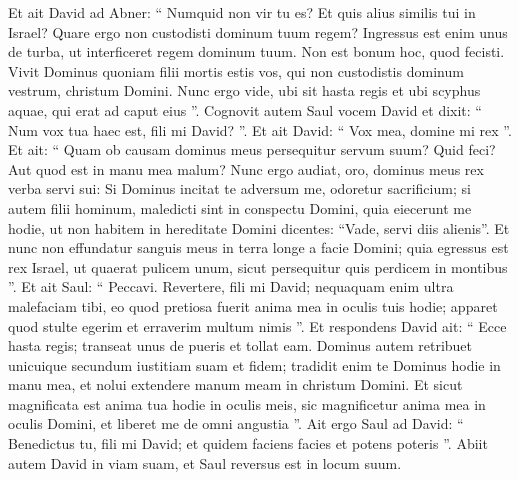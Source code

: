 \begin{biblechapter}
\begin{biblechapter}
\begin{biblechapter}
\begin{biblechapter}
\begin{biblechapter}
\begin{biblechapter}
\begin{biblechapter}
\begin{biblechapter}
\begin{biblechapter}
\begin{biblechapter}
\begin{biblechapter}
\begin{biblechapter}
\begin{biblechapter}
\begin{biblechapter}
\begin{biblechapter}
\begin{biblechapter}
\begin{biblechapter}
\begin{biblechapter}
\begin{biblechapter}
\begin{biblechapter}
\begin{biblechapter}
\begin{biblechapter}
\begin{biblechapter}
\begin{biblechapter}
\begin{biblechapter}
\begin{biblechapter}
\verse Et ait David ad Abner: “ Numquid non vir tu es? Et quis alius similis tui in Israel? Quare ergo non custodisti dominum tuum regem? Ingressus est enim unus de turba, ut interficeret regem dominum tuum. 
\verse Non est bonum hoc, quod fecisti. Vivit Dominus quoniam filii mortis estis vos, qui non custodistis dominum vestrum, christum Domini. Nunc ergo vide, ubi sit hasta regis et ubi scyphus aquae, qui erat ad caput eius ”.
 \verse Cognovit autem Saul vocem David et dixit: “ Num vox tua haec est, fili mi David? ”. Et ait David: “ Vox mea, domine mi rex ”. 
\verse Et ait: “ Quam ob causam dominus meus persequitur servum suum? Quid feci? Aut quod est in manu mea malum? 
\verse Nunc ergo audiat, oro, dominus meus rex verba servi sui: Si Dominus incitat te adversum me, odoretur sacrificium; si autem filii hominum, maledicti sint in conspectu Domini, quia eiecerunt me hodie, ut non habitem in hereditate Domini dicentes: “Vade, servi diis alienis”. 
\verse Et nunc non effundatur sanguis meus in terra longe a facie Domini; quia egressus est rex Israel, ut quaerat pulicem unum, sicut persequitur quis perdicem in montibus ”.
 \verse Et ait Saul: “ Peccavi. Revertere, fili mi David; nequaquam enim ultra malefaciam tibi, eo quod pretiosa fuerit anima mea in oculis tuis hodie; apparet quod stulte egerim et erraverim multum nimis ”. 
\verse Et respondens David ait: “ Ecce hasta regis; transeat unus de pueris et tollat eam. 
\verse Dominus autem retribuet unicuique secundum iustitiam suam et fidem; tradidit enim te Dominus hodie in manu mea, et nolui extendere manum meam in christum Domini. 
\verse Et sicut magnificata est anima tua hodie in oculis meis, sic magnificetur anima mea in oculis Domini, et liberet me de omni angustia ”.
 \verse Ait ergo Saul ad David: “ Benedictus tu, fili mi David; et quidem faciens facies et potens poteris ”. Abiit autem David in viam suam, et Saul reversus est in locum suum.
 

\end{biblechapter}
\end{biblechapter}
\end{biblechapter}
\end{biblechapter}
\end{biblechapter}
\end{biblechapter}
\end{biblechapter}
\end{biblechapter}
\end{biblechapter}
\end{biblechapter}
\end{biblechapter}
\end{biblechapter}
\end{biblechapter}
\end{biblechapter}
\end{biblechapter}
\end{biblechapter}
\end{biblechapter}
\end{biblechapter}
\end{biblechapter}
\end{biblechapter}
\end{biblechapter}
\end{biblechapter}
\end{biblechapter}
\end{biblechapter}
\end{biblechapter}
\end{biblechapter}
